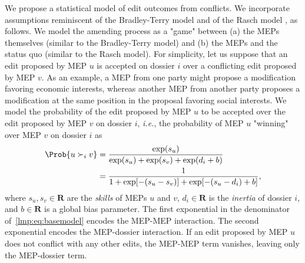 We propose a statistical model of edit outcomes from conflicts.
We incorporate assumptions reminiscent of the Bradley-Terry model \cite{bradley1952rank} and of the Rasch model \cite{rasch1960probabilistic}, as follows.
We model the amending process as a "game" between (a) the MEPs themselves (similar to the Bradley-Terry model) and (b) the MEPs and the status quo (similar to the Rasch model).
For simplicity, let us suppose that an edit proposed by MEP $u$ is accepted on dossier $i$ over a conflicting edit proposed by MEP $v$.
As an example, a MEP from one party might propose a modification favoring economic interests, whereas another MEP from another party proposes a modification at the same position in the proposal favoring social interests.
We model the probability of the edit proposed by MEP $u$ to be accepted over the edit proposed by MEP $v$ on dossier $i$, \textit{i.e.}, the  probability of MEP $u$ "winning" over MEP $v$ on dossier $i$ as
\begin{align}
	\label{lmp:eq:basemodel}
  \Prob{ u \succ_i v }
	 & = \frac{\exp(s_u)}{\exp(s_u) + \exp(s_v) + \exp(d_i + b)} \nonumber  \\
	 & = \frac{1}{1 + \exp[ -( s_u - s_v ) ] + \exp[ -( s_u - d_i ) + b ]},
\end{align}
where $ s_u, s_v \in \mathbf{R} $ are the \textit{skills} of MEPs $u$ and $v$, $ d_i \in \mathbf{R} $ is the \textit{inertia} of dossier $i$, and $ b \in \mathbf{R} $ is a global bias parameter.
The first exponential in the denominator of~\eqref{lmp:eq:basemodel} encodes the MEP-MEP interaction.
The second exponential encodes the MEP-dossier interaction.
If an edit proposed by MEP $u$ does not conflict with any other edits, the MEP-MEP term vanishes, leaving only the MEP-dossier term.

